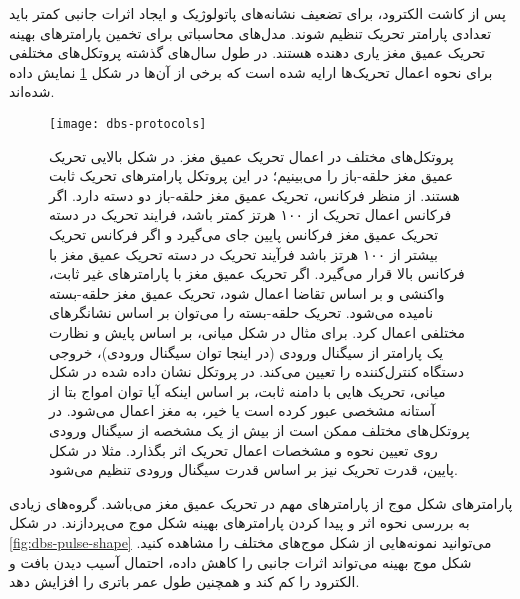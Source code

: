 پس از کاشت الکترود، برای تضعیف نشانه‌های پاتولوژیک و ایجاد اثرات جانبی کمتر باید تعدادی پارامتر تحریک تنظیم شوند. مدل‌های محاسباتی برای تخمین پارامترهای بهینه تحریک عمیق مغز یاری دهنده هستند. در طول سال‌های گذشته پروتکل‌های مختلفی برای نحوه اعمال تحریک‌ها ارایه شده است که برخی از آن‌ها در شکل
\ref{fig:dbs-protocols}
نمایش داده شده‌اند.

\begin{figure}
	\centering
	\texttt{[image: dbs-protocols]}
    \caption{
    پروتکل‌های مختلف در اعمال تحریک عمیق مغز.
در شکل بالایی تحریک عمیق مغز حلقه-باز را می‌بینیم؛ در این پروتکل پارامترهای تحریک ثابت هستند. از منظر فرکانس، تحریک عمیق مغز حلقه-باز دو دسته دارد. اگر فرکانس اعمال تحریک از ۱۰۰ هرتز کمتر باشد، فرایند تحریک در دسته تحریک عمیق مغز فرکانس پایین جای می‌گیرد و اگر فرکانس تحریک بیشتر از ۱۰۰ هرتز باشد فرآیند تحریک در دسته تحریک عمیق مغز با فرکانس بالا قرار می‌گیرد. اگر تحریک عمیق مغز با پارامتر‌های غیر ثابت، واکنشی و بر اساس تقاضا اعمال شود، تحریک عمیق مغز حلقه-بسته نامیده می‌شود. تحریک حلقه-بسته را می‌توان بر اساس نشانگرهای مختلفی اعمال کرد. برای مثال در شکل میانی، بر اساس پایش و نظارت یک پارامتر از سیگنال ورودی (در اینجا توان سیگنال ورودی)، خروجی دستگاه کنترل‌کننده را تعیین می‌کند. در پروتکل نشان داده شده در شکل میانی، تحریک هایی با دامنه ثابت، بر اساس اینکه آیا توان امواج بتا از آستانه مشخصی عبور کرده است یا خیر، به مغز اعمال می‌شود.
در پروتکل‌های مختلف ممکن است از بیش از یک مشخصه از سیگنال ورودی روی تعیین نحوه و مشخصات اعمال تحریک اثر بگذارد. مثلا در شکل پایین، قدرت تحریک نیز بر اساس قدرت سیگنال ورودی تنظیم می‌شود.
    }
    \label{fig:dbs-protocols}
\end{figure}

پارامترهای شکل موج از پارامترهای مهم در تحریک عمیق مغز می‌باشد. گروه‌های زیادی به بررسی نحوه اثر و پیدا کردن پارامترهای بهینه شکل موج می‌پردازند. در شکل 
\ref{fig:dbs-pulse-shape}
می‌توانید نمونه‌هایی از شکل موج‌های مختلف را مشاهده کنید. شکل موج بهینه می‌تواند اثرات جانبی را کاهش داده، احتمال آسیب دیدن بافت و الکترود را کم کند و همچنین طول عمر باتری را افزایش دهد. 


